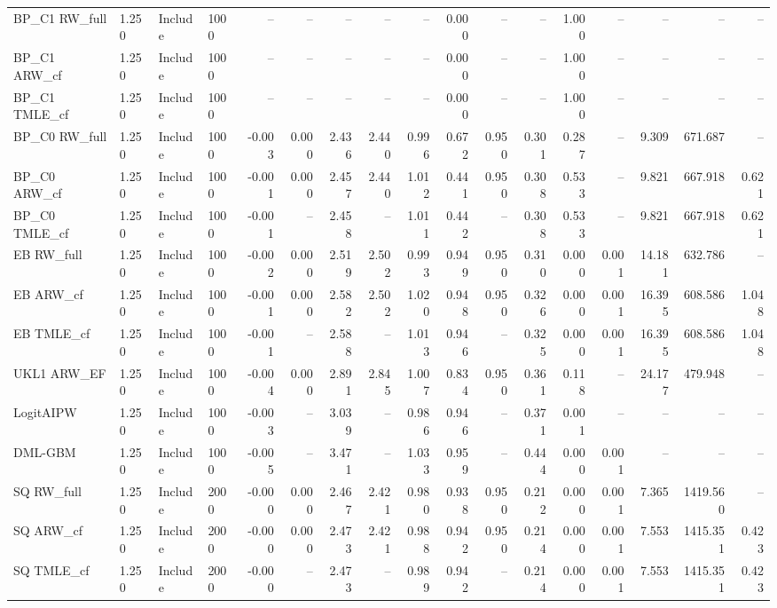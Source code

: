 \begin{tabular}{llllrrrrrrrrrrrrr}
BP\_C1 RW\_full & 1.250 & Include & 1000 & -- & -- & -- & -- & -- & 0.000 & -- & -- & 1.000 & -- & -- & -- & -- \\
BP\_C1 ARW\_cf & 1.250 & Include & 1000 & -- & -- & -- & -- & -- & 0.000 & -- & -- & 1.000 & -- & -- & -- & -- \\
BP\_C1 TMLE\_cf & 1.250 & Include & 1000 & -- & -- & -- & -- & -- & 0.000 & -- & -- & 1.000 & -- & -- & -- & -- \\
BP\_C0 RW\_full & 1.250 & Include & 1000 & -0.003 & 0.000 & 2.436 & 2.440 & 0.996 & 0.672 & 0.950 & 0.301 & 0.287 & -- & 9.309 & 671.687 & -- \\
BP\_C0 ARW\_cf & 1.250 & Include & 1000 & -0.001 & 0.000 & 2.457 & 2.440 & 1.012 & 0.441 & 0.950 & 0.308 & 0.533 & -- & 9.821 & 667.918 & 0.621 \\
BP\_C0 TMLE\_cf & 1.250 & Include & 1000 & -0.001 & -- & 2.458 & -- & 1.011 & 0.442 & -- & 0.308 & 0.533 & -- & 9.821 & 667.918 & 0.621 \\
EB RW\_full & 1.250 & Include & 1000 & -0.002 & 0.000 & 2.519 & 2.502 & 0.993 & 0.949 & 0.950 & 0.310 & 0.000 & 0.001 & 14.181 & 632.786 & -- \\
EB ARW\_cf & 1.250 & Include & 1000 & -0.001 & 0.000 & 2.582 & 2.502 & 1.020 & 0.948 & 0.950 & 0.326 & 0.000 & 0.001 & 16.395 & 608.586 & 1.048 \\
EB TMLE\_cf & 1.250 & Include & 1000 & -0.001 & -- & 2.588 & -- & 1.013 & 0.946 & -- & 0.325 & 0.000 & 0.001 & 16.395 & 608.586 & 1.048 \\
UKL1 ARW\_EF & 1.250 & Include & 1000 & -0.004 & 0.000 & 2.891 & 2.845 & 1.007 & 0.834 & 0.950 & 0.361 & 0.118 & -- & 24.177 & 479.948 & -- \\
LogitAIPW & 1.250 & Include & 1000 & -0.003 & -- & 3.039 & -- & 0.986 & 0.946 & -- & 0.371 & 0.001 & -- & -- & -- & -- \\
DML-GBM & 1.250 & Include & 1000 & -0.005 & -- & 3.471 & -- & 1.033 & 0.959 & -- & 0.444 & 0.000 & 0.001 & -- & -- & -- \\
SQ RW\_full & 1.250 & Include & 2000 & -0.000 & 0.000 & 2.467 & 2.421 & 0.980 & 0.938 & 0.950 & 0.212 & 0.000 & 0.001 & 7.365 & 1419.560 & -- \\
SQ ARW\_cf & 1.250 & Include & 2000 & -0.000 & 0.000 & 2.473 & 2.421 & 0.988 & 0.942 & 0.950 & 0.214 & 0.000 & 0.001 & 7.553 & 1415.351 & 0.423 \\
SQ TMLE\_cf & 1.250 & Include & 2000 & -0.000 & -- & 2.473 & -- & 0.989 & 0.942 & -- & 0.214 & 0.000 & 0.001 & 7.553 & 1415.351 & 0.423 \\

\end{tabular}
